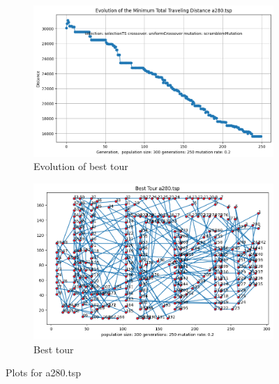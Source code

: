 \documentclass[12pt]{report}
\begin{document}
    \begin{figure}[H]
		\centering
		\begin{subfigure}{.5\textwidth}
			\centering
			\includegraphics[width=.99\linewidth]{../Results/a280/Evolution.png}
			\caption{Evolution of best tour}
			\label{Evolutiona280}
		\end{subfigure}%
		\begin{subfigure}{.5\textwidth}
			\centering
			\includegraphics[width=.8\linewidth]{../Results/a280/bestTour.png}
			\caption{Best tour}
			\label{bestToura280}
		\end{subfigure}
		\caption{Plots for a280.tsp}
		\label{Plotsa280}
	\end{figure}
     
	 


\end{document}
